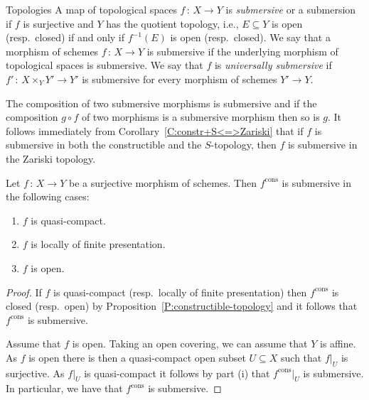 \documentclass[a4paper,twoside,11pt]{amsart}[2009/07/02] %
\newcommand{\pref}[1]{\eqref{#1}}
\newcommand{\map}[3]{#1\,:\, #2\rightarrow #3}
\newcommand{\cons}{\mathrm{cons}} %
\begin{document}
\begin{section}{Topologies}
A map of topological spaces $\map{f}{X}{Y}$ is \emph{submersive} or a
submersion if $f$ is surjective and $Y$ has the quotient topology, i.e.,
$E\subseteq Y$ is open (resp.\ closed) if and only if $f^{-1}(E)$ is open
(resp.\ closed). We say that a morphism of schemes $\map{f}{X}{Y}$ is
submersive if the underlying morphism of topological spaces is submersive. We
say that $f$ is \emph{universally submersive} if $\map{f'}{X\times_Y Y'}{Y'}$
is submersive for every morphism of schemes $Y'\to Y$.

The composition of two submersive morphisms is submersive and if the
composition $g\circ f$ of two morphisms is a submersive morphism then so is
$g$. It follows immediately from Corollary~\pref{C:constr+S<=>Zariski} that if
$f$ is submersive in both the constructible and the $S$-topology, then $f$ is
submersive in the Zariski topology.


\begin{proposition}\label{P:submersions-in-cons}
Let $\map{f}{X}{Y}$ be a surjective morphism of schemes. Then $f^{\cons}$ is
submersive in the following cases:
%
\begin{enumerate}
\item $f$ is quasi-compact.
\item $f$ is locally of finite presentation.
\item $f$ is open.
\end{enumerate}
%
\end{proposition}
\begin{proof}
If $f$ is quasi-compact (resp.\ locally of finite presentation) then
$f^{\cons}$ is closed (resp.\ open) by
Proposition~\pref{P:constructible-topology} and it follows that $f^{\cons}$ is
submersive.

Assume that $f$ is open. Taking an open covering, we can assume that $Y$ is
affine.
%
As $f$ is open there is then a quasi-compact open subset $U\subseteq X$ such
that $f|_U$ is surjective. As $f|_U$ is quasi-compact it follows by part (i)
that $f^{\cons}|_U$ is submersive. In particular, we have that $f^{\cons}$ is
submersive.
\end{proof}


\end{section}
\end{document}
